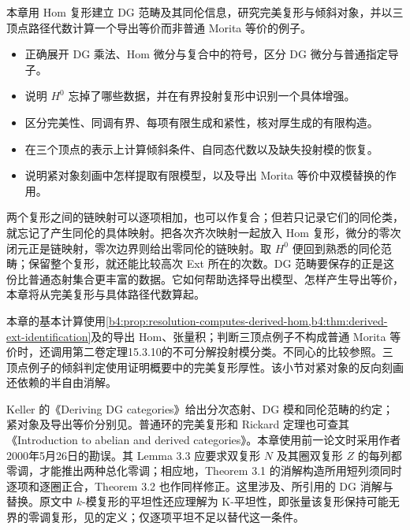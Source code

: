 

\begin{chapterabstract}
	本章用 Hom 复形建立 DG 范畴及其同伦信息，研究完美复形与倾斜对象，并以三顶点路径代数计算一个导出等价而非普通 Morita 等价的例子。
\end{chapterabstract}

\begin{learninggoals}
	\begin{itemize}
		\item 正确展开 DG 乘法、Hom 微分与复合中的符号，区分 DG 微分与普通指定导子。
		\item 说明 \(H^0\) 忘掉了哪些数据，并在有界投射复形中识别一个具体增强。
		\item 区分完美性、同调有界、每项有限生成和紧性，核对厚生成的有限构造。
		\item 在三个顶点的表示上计算倾斜条件、自同态代数以及缺失投射模的恢复。
		\item 说明紧对象刻画中怎样提取有限模型，以及导出 Morita 等价中双模替换的作用。
	\end{itemize}
\end{learninggoals}

两个复形之间的链映射可以逐项相加，也可以作复合；但若只记录它们的同伦类，就忘记了产生同伦的具体映射。把各次齐次映射一起放入 Hom 复形，微分的零次闭元正是链映射，零次边界则给出零同伦的链映射。取 \(H^0\) 便回到熟悉的同伦范畴；保留整个复形，就还能比较高次 Ext 所在的次数。DG 范畴要保存的正是这份比普通态射集合更丰富的数据。它如何帮助选择导出模型、怎样产生导出等价，本章将从完美复形与具体路径代数算起。

\ProseParagraphBreak
本章的基本计算使用\cref{b4:prop:resolution-computes-derived-hom,b4:thm:derived-ext-identification}及的导出 Hom、张量积；判断三顶点例子不构成普通 Morita 等价时，还调用第二卷定理15.3.10的不可分解投射模分类。不同心的比较参照。三顶点例子的倾斜判定使用证明概要中的完美复形厚性。该小节对紧对象的反向刻画还依赖的半自由消解。

\ProseParagraphBreak
Keller 的《Deriving DG categories》\cite[Sections 1.1--2.2]{Keller1994DerivingDG}给出分次态射、DG 模和同伦范畴的约定；紧对象及导出等价分别见\cite[Section 5.3; Sections 8.2 and 9.1--9.2]{Keller1994DerivingDG}。普通环的完美复形和 Rickard 定理也可查其《Introduction to abelian and derived categories》\cite[Sections 3.1 and 4]{Keller1998AbelianDerived}。本章使用前一论文时采用作者2000年5月26日的勘误。其 Lemma 3.3 应要求双复形 \(N\) 及其圈双复形 \(Z\) 的每列都零调，才能推出两种总化零调；相应地，Theorem 3.1 的消解构造所用短列须同时逐项和逐圈正合，Theorem 3.2 也作同样修正。这里涉及、所引用的 DG 消解与替换。原文中 \(k\)-模复形的平坦性还应理解为 K-平坦性，即张量该复形保持可能无界的零调复形，见的定义；仅逐项平坦不足以替代这一条件。

